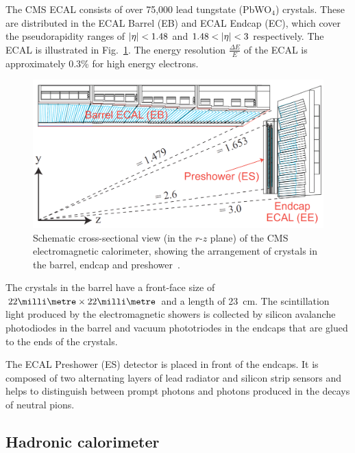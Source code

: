 
The CMS ECAL consists of over 75,000 lead tungstate (PbWO$_4$) crystals. These 
are distributed in the ECAL Barrel (EB) and ECAL Endcap (EC), which cover the 
pseudorapidity ranges of $|\eta|<1.48$ and $1.48 < |\eta| < 3$ 
respectively. The ECAL is illustrated in Fig.~\ref{fig:ecal}. 
The energy resolution $\frac{\Delta E}{E}$ of the ECAL is approximately 0.3\% 
for high energy electrons.

\begin{figure}
	\begin{center}
		\includegraphics[width=0.7\linewidth]{figs/detector/ecal}
	\end{center}
	\caption{Schematic cross-sectional view (in the $r$-$z$ plane) of the CMS 
		electromagnetic calorimeter, showing the arrangement of crystals in the 
		barrel, 
		endcap and preshower~\cite{cms}.}
	\label{fig:ecal}
\end{figure}

The crystals in the barrel have a front-face size of 
$22\milli\metre \times 22\milli\metre$ and a length of 23~cm. The scintillation 
light produced by the electromagnetic showers is collected by silicon 
avalanche photodiodes in the barrel and vacuum phototriodes in the endcaps that 
are glued to the ends of the crystals.

The ECAL Preshower (ES) detector is placed in front of the endcaps. It is 
composed of two alternating layers of lead radiator and silicon strip sensors 
and helps to distinguish between prompt photons and photons produced in the 
decays of neutral pions.%

\subsection{Hadronic calorimeter}

